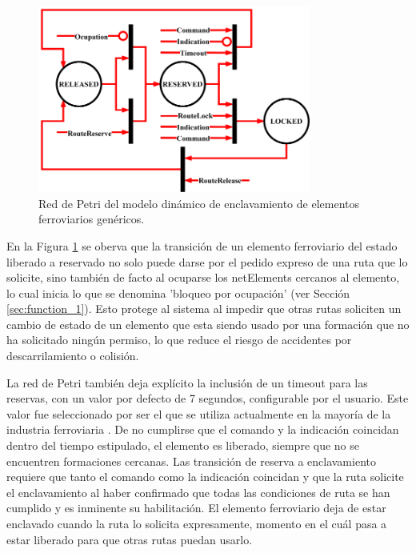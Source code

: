 	\begin{figure}[H]
		\centering
		\includegraphics[width=0.8\textwidth]{Figuras/INT_petri}
		\centering\caption{Red de Petri del modelo dinámico de enclavamiento de elementos ferroviarios genéricos.}
		\label{fig:Interlocking_petri}
	\end{figure}
	
	En la Figura \ref{fig:Interlocking_petri} se oberva que la transición de un elemento ferroviario del estado liberado a reservado no solo puede darse por el pedido expreso de una ruta que lo solicite, sino también de facto al ocuparse los netElements cercanos al elemento, lo cual inicia lo que se denomina 'bloqueo por ocupación' (ver Sección \ref{sec:function_1}). Esto protege al sistema al impedir que otras rutas soliciten un cambio de estado de un elemento que esta siendo usado por una formación que no ha solicitado ningún permiso, lo que reduce el riesgo de accidentes por descarrilamiento o colisión. 
	
	La red de Petri también deja explícito la inclusión de un timeout para las reservas, con un valor por defecto de 7 segundos, configurable por el usuario. Este valor fue seleccionado por ser el que se utiliza actualmente en la mayoría de la industria ferroviaria \cite{ARTC}. De no cumplirse que el comando y la indicación coincidan dentro del tiempo estipulado, el elemento es liberado, siempre que no se encuentren formaciones cercanas. Las transición de reserva a enclavamiento requiere que tanto el comando como la indicación coincidan y que la ruta solicite el enclavamiento al haber confirmado que todas las condiciones de ruta se han cumplido y es inminente su habilitación. El elemento ferroviario deja de estar enclavado cuando la ruta lo solicita expresamente, momento en el cuál pasa a estar liberado para que otras rutas puedan usarlo.
	
